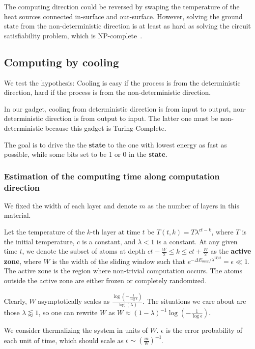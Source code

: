 \documentclass[twocolumn,superscriptaddress,english,showpacs,longbibliography]{revtex4-2}
\begin{document}
The computing direction could be reversed by swaping the temperature of the heat sources connected in-surface and out-surface.
However, solving the ground state from the non-deterministic direction is at least as hard as solving the circuit satisfiability problem, which is NP-complete~\cite{Moore2011}.

\subsection{Computing by cooling}\label{local-cooling}

We test the hypothesis: Cooling is easy if the process is from the
deterministic direction, hard if the process is from the
non-deterministic direction.

In our gadget, cooling from deterministic direction is from input to
output, non-deterministic direction is from output to input. The latter
one must be non-deterministic because this gadget is Turing-Complete.

The goal is to drive the the \textbf{state} to the one with lowest energy as fast as possible, while some bits set to be 1 or 0 in the \textbf{state}.

\subsubsection{Estimation of the computing time along computation direction}\label{estimation-of-the-computing-time}

We fixed the width of each layer and denote $m$ as the number of layers in this material.

Let the temperature of the $k$-th layer at time $t$ be
$T(t, k) = T \lambda^{ct - k}$, where $T$ is the initial
temperature, $c$ is a constant, and $\lambda < 1$ is a constant. At
any given time $t$, we denote the subset of atoms at depth
$ct-\frac{W}{2}\le k \le ct + \frac{W}{2}$ as the \textbf{active zone},
where $W$ is the width of the sliding window such that
$e^{-\Delta E_{max} /\lambda^{W/2}} = \epsilon \ll 1$. The active zone
is the region where non-trivial computation occurs. The atoms outside
the active zone are either frozen or completely randomized. 

Clearly, $W$ asymptotically scales as $\frac{\log(-\frac{1}{\log{\epsilon}})}{\log(\lambda)}$. The situations we care about
are those $\lambda \lessapprox 1$, so one can rewrite $W$ as $W \approx (1-\lambda)^{-1} \log(-\frac{1}{\log\epsilon})$.

We consider thermalizing the system in units of $W$. $\epsilon$ is
the error probability of each unit of time, which should scale as
$\epsilon \sim\left(\frac{m}{W}\right)^{-1}$.
\end{document}
